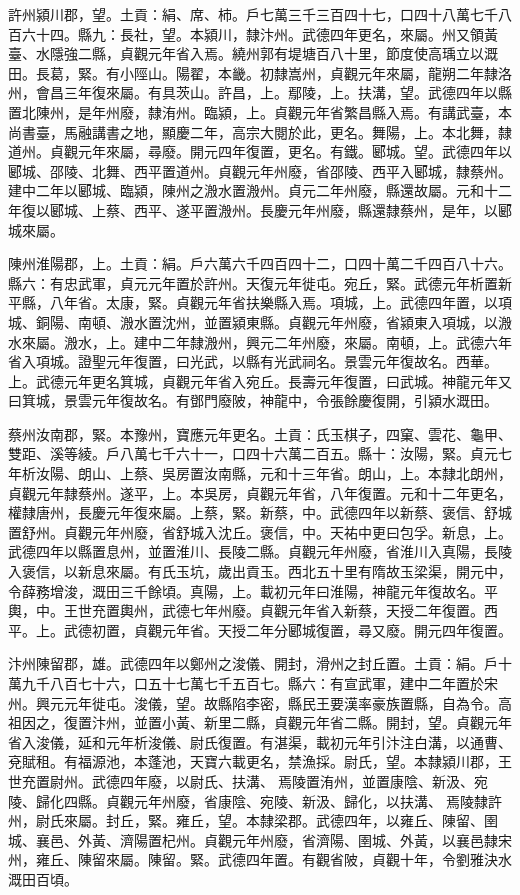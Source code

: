 \begin{pinyinscope}
 許州潁川郡，望。土貢：絹、席、柿。戶七萬三千三百四十七，口四十八萬七千八百六十四。縣九：長社，望。本潁川，隸汴州。武德四年更名，來屬。州又領黃臺、水隱強二縣，貞觀元年省入焉。繞州郭有堤塘百八十里，節度使高瑀立以溉田。長葛，緊。有小陘山。陽翟，本畿。初隸嵩州，貞觀元年來屬，龍朔二年隸洛州，會昌三年復來屬。有具茨山。許昌，上。鄢陵，上。扶溝，望。武德四年以縣置北陳州，是年州廢，隸洧州。臨潁，上。貞觀元年省繁昌縣入焉。有講武臺，本尚書臺，馬融講書之地，顯慶二年，高宗大閱於此，更名。舞陽，上。本北舞，隸道州。貞觀元年來屬，尋廢。開元四年復置，更名。有鐵。郾城。望。武德四年以郾城、邵陵、北舞、西平置道州。貞觀元年州廢，省邵陵、西平入郾城，隸蔡州。建中二年以郾城、臨潁，陳州之溵水置溵州。貞元二年州廢，縣還故屬。元和十二年復以郾城、上蔡、西平、遂平置溵州。長慶元年州廢，縣還隸蔡州，是年，以郾城來屬。



 陳州淮陽郡，上。土貢：絹。戶六萬六千四百四十二，口四十萬二千四百八十六。縣六：有忠武軍，貞元元年置於許州。天復元年徙屯。宛丘，緊。武德元年析置新平縣，八年省。太康，緊。貞觀元年省扶樂縣入焉。項城，上。武德四年置，以項城、銅陽、南頓、溵水置沈州，並置潁東縣。貞觀元年州廢，省潁東入項城，以溵水來屬。溵水，上。建中二年隸溵州，興元二年州廢，來屬。南頓，上。武德六年省入項城。證聖元年復置，曰光武，以縣有光武祠名。景雲元年復故名。西華。上。武德元年更名箕城，貞觀元年省入宛丘。長壽元年復置，曰武城。神龍元年又曰箕城，景雲元年復故名。有鄧門廢陂，神龍中，令張餘慶復開，引潁水溉田。



 蔡州汝南郡，緊。本豫州，寶應元年更名。土貢：氏玉棋子，四窠、雲花、龜甲、雙距、溪等綾。戶八萬七千六十一，口四十六萬二百五。縣十：汝陽，緊。貞元七年析汝陽、朗山、上蔡、吳房置汝南縣，元和十三年省。朗山，上。本隸北朗州，貞觀元年隸蔡州。遂平，上。本吳房，貞觀元年省，八年復置。元和十二年更名，權隸唐州，長慶元年復來屬。上蔡，緊。新蔡，中。武德四年以新蔡、褒信、舒城置舒州。貞觀元年州廢，省舒城入沈丘。褒信，中。天祐中更曰包孚。新息，上。武德四年以縣置息州，並置淮川、長陵二縣。貞觀元年州廢，省淮川入真陽，長陵入褒信，以新息來屬。有氏玉坑，歲出貢玉。西北五十里有隋故玉梁渠，開元中，令薛務增浚，溉田三千餘頃。真陽，上。載初元年曰淮陽，神龍元年復故名。平輿，中。王世充置輿州，武德七年州廢。貞觀元年省入新蔡，天授二年復置。西平。上。武德初置，貞觀元年省。天授二年分郾城復置，尋又廢。開元四年復置。



 汴州陳留郡，雄。武德四年以鄭州之浚儀、開封，滑州之封丘置。土貢：絹。戶十萬九千八百七十六，口五十七萬七千五百七。縣六：有宣武軍，建中二年置於宋州。興元元年徙屯。浚儀，望。故縣陷李密，縣民王要漢率豪族置縣，自為令。高祖因之，復置汴州，並置小黃、新里二縣，貞觀元年省二縣。開封，望。貞觀元年省入浚儀，延和元年析浚儀、尉氏復置。有湛渠，載初元年引汴注白溝，以通曹、兗賦租。有福源池，本蓬池，天寶六載更名，禁漁採。尉氏，望。本隸潁川郡，王世充置尉州。武德四年廢，以尉氏、扶溝、焉陵置洧州，並置康陰、新汲、宛陵、歸化四縣。貞觀元年州廢，省康陰、宛陵、新汲、歸化，以扶溝、焉陵隸許州，尉氏來屬。封丘，緊。雍丘，望。本隸梁郡。武德四年，以雍丘、陳留、圉城、襄邑、外黃、濟陽置杞州。貞觀元年州廢，省濟陽、圉城、外黃，以襄邑隸宋州，雍丘、陳留來屬。陳留。緊。武德四年置。有觀省陂，貞觀十年，令劉雅決水溉田百頃。




\end{pinyinscope}
